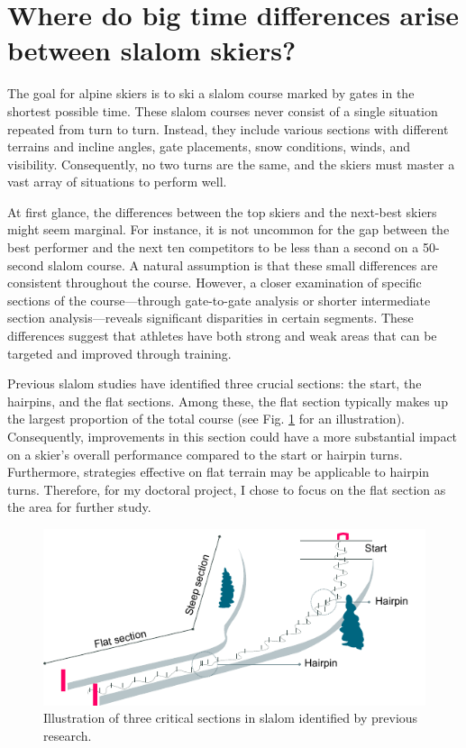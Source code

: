 
\section{Where do big time differences arise between slalom skiers? }
The goal for alpine skiers is to ski a slalom course marked by gates in the shortest possible time. These slalom courses never consist of a single situation repeated from turn to turn. Instead, they include various sections with different terrains and incline angles, gate placements, snow conditions, winds, and visibility. Consequently, no two turns are the same, and the skiers must master a vast array of situations to perform well. 

At first glance, the differences between the top skiers and the next-best skiers might seem marginal. For instance, it is not uncommon for the gap between the best performer and the next ten competitors to be less than a second on a 50-second slalom course. A natural assumption is that these small differences are consistent throughout the course. However, a closer examination of specific sections of the course—through gate-to-gate analysis or shorter intermediate section analysis—reveals significant disparities in certain segments\cite{supej_relations_2006, reid_kinematic_2010, supej_new_2011, supej_mechanical_2011, federolf_quantifying_2012}. These differences suggest that athletes have both strong and weak areas that can be targeted and improved through training.

Previous slalom studies have identified three crucial sections: the start, the hairpins, and the flat sections\cite{supej_new_2011}. Among these, the flat section typically makes up the largest proportion of the total course (see Fig. \ref{fig: flatcourse} for an illustration). Consequently, improvements in this section could have a more substantial impact on a skier's overall performance compared to the start or hairpin turns. Furthermore, strategies effective on flat terrain may be applicable to hairpin turns. Therefore, for my doctoral project, I chose to focus on the flat section as the area for further study.

\begin{figure}
    \centering
    \includegraphics[width=1\linewidth]{figure/figure_introduction_course.pdf}
    \caption[Illustration of three critical sections in slalom identified by previous research]{Illustration of three critical sections in slalom identified by previous research.}
    \label{fig: flatcourse}
\end{figure}

